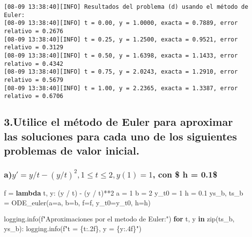 \documentclass[
  letterpaper,
  DIV=11,
  numbers=noendperiod]{scrartcl}
\newenvironment{Shaded}{\begin{snugshade}}{\end{snugshade}}
\newcommand{\BuiltInTok}[1]{\textcolor[rgb]{0.00,0.23,0.31}{#1}}
\newcommand{\ControlFlowTok}[1]{\textcolor[rgb]{0.00,0.23,0.31}{\textbf{#1}}}
\newcommand{\DecValTok}[1]{\textcolor[rgb]{0.68,0.00,0.00}{#1}}
\newcommand{\FloatTok}[1]{\textcolor[rgb]{0.68,0.00,0.00}{#1}}
\newcommand{\KeywordTok}[1]{\textcolor[rgb]{0.00,0.23,0.31}{\textbf{#1}}}
\newcommand{\NormalTok}[1]{\textcolor[rgb]{0.00,0.23,0.31}{#1}}
\newcommand{\OperatorTok}[1]{\textcolor[rgb]{0.37,0.37,0.37}{#1}}
\newcommand{\SpecialCharTok}[1]{\textcolor[rgb]{0.37,0.37,0.37}{#1}}
\newcommand{\SpecialStringTok}[1]{\textcolor[rgb]{0.13,0.47,0.30}{#1}}
\begin{document}
\begin{verbatim}
[08-09 13:38:40][INFO] Resultados del problema (d) usando el método de Euler:
[08-09 13:38:40][INFO] t = 0.00, y = 1.0000, exacta = 0.7889, error relativo = 0.2676
[08-09 13:38:40][INFO] t = 0.25, y = 1.2500, exacta = 0.9521, error relativo = 0.3129
[08-09 13:38:40][INFO] t = 0.50, y = 1.6398, exacta = 1.1433, error relativo = 0.4342
[08-09 13:38:40][INFO] t = 0.75, y = 2.0243, exacta = 1.2910, error relativo = 0.5679
[08-09 13:38:40][INFO] t = 1.00, y = 2.2365, exacta = 1.3387, error relativo = 0.6706
\end{verbatim}

\subsection{3.Utilice el método de Euler para aproximar las soluciones
para cada uno de los siguientes problemas de valor
inicial.}\label{utilice-el-muxe9todo-de-euler-para-aproximar-las-soluciones-para-cada-uno-de-los-siguientes-problemas-de-valor-inicial.}

\subsubsection{\texorpdfstring{a)\(y' = y/t-(y/t)^2, 1 \leq t \leq 2 ,  y(1) = 1\),
con \$ h =
0.1\$}{a)y\textquotesingle{} = y/t-(y/t)\^{}2, 1 \textbackslash leq t \textbackslash leq 2 ,  y(1) = 1, con \$ h = 0.1\$}}\label{ay-yt-yt2-1-leq-t-leq-2-y1-1-con-h-0.1}

\begin{Shaded}
\begin{Highlighting}[]
\NormalTok{f }\OperatorTok{=} \KeywordTok{lambda}\NormalTok{ t, y: (y }\OperatorTok{/}\NormalTok{ t) }\OperatorTok{{-}}\NormalTok{ (y }\OperatorTok{/}\NormalTok{ t)}\OperatorTok{**}\DecValTok{2}
\NormalTok{a }\OperatorTok{=} \DecValTok{1} 
\NormalTok{b }\OperatorTok{=} \DecValTok{2}  
\NormalTok{y\_t0 }\OperatorTok{=} \DecValTok{1} 
\NormalTok{h }\OperatorTok{=} \FloatTok{0.1} 
\NormalTok{ys\_b, ts\_b }\OperatorTok{=}\NormalTok{ ODE\_euler(a}\OperatorTok{=}\NormalTok{a, b}\OperatorTok{=}\NormalTok{b, f}\OperatorTok{=}\NormalTok{f, y\_t0}\OperatorTok{=}\NormalTok{y\_t0, h}\OperatorTok{=}\NormalTok{h)}

\NormalTok{logging.info(}\SpecialStringTok{f"Aproximaciones por el metodo de Euler:"}\NormalTok{)}
\ControlFlowTok{for}\NormalTok{ t, y }\KeywordTok{in} \BuiltInTok{zip}\NormalTok{(ts\_b, ys\_b):}
\NormalTok{    logging.info(}\SpecialStringTok{f"t = }\SpecialCharTok{\{}\NormalTok{t}\SpecialCharTok{:.2f\}}\SpecialStringTok{, y = }\SpecialCharTok{\{}\NormalTok{y}\SpecialCharTok{:.4f\}}\SpecialStringTok{"}\NormalTok{)}
\end{Highlighting}
\end{Shaded}
\end{document}
